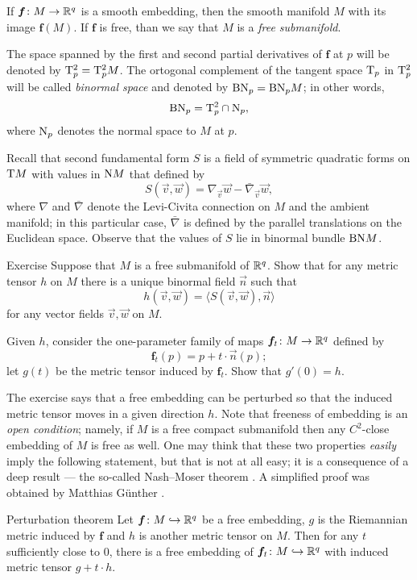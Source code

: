 If $\bm{f}\colon M\to \mathbb{R}^q$ is a smooth embedding, then the smooth manifold $M$ with its image $\bm{f}(M)$.
If $\bm{f}$ is free, than we say that $M$ is a \emph{free submanifold}.

The space spanned by the first and second partial derivatives of $\bm{f}$ at $p$ will be denoted by $\mathrm{T}^2_p=\mathrm{T}^2_pM$.
The ortogonal complement of the tangent space $\mathrm{T}_p$ in $\mathrm{T}^2_p$ will be called \emph{binormal space} and denoted by $\mathrm{BN}_p=\mathrm{BN}_pM$; in other words,
\[\mathrm{BN}_p=\mathrm{T}^2_p\cap\mathrm{N}_p,\]
where $\mathrm{N}_p$ denotes the normal space to $M$ at $p$.

Recall that second fundamental form $S$ is a field of symmetric quadratic forms on $\mathrm{T} M$  with values in $\mathrm{N} M$ that defined by 
\[S(\vec v,\vec w)=\nabla_{\vec v}\vec w-\bar\nabla_{\vec v}\vec w,\]
where $\nabla$ and $\bar \nabla$ denote the Levi-Civita connection on $M$ and the ambient manifold;
in this particular case, $\bar \nabla$ is defined by the parallel translations on the Euclidean space.
Observe that the values of $S$ lie in binormal bundle $\mathrm{BN} M$.

\begin{thm}{Exercise}\label{ex:binormal}
Suppose that $M$ is a free submanifold of $\mathbb{R}^q$.
Show that for any metric tensor $h$ on $M$ there is a unique binormal field $\vec n$ such  that 
\[h(\vec v,\vec w)=\langle S(\vec v,\vec w),\vec n\rangle\]
for any vector fields $\vec v,\vec w$ on $M$.

Given $h$, consider the one-parameter family of maps $\bm{f}_t\colon M\to \mathbb{R}^q$ defined by 
\[\bm{f}_t(p)= p+t\cdot \vec n(p);\]
let $g(t)$ be the metric tensor induced by $\bm{f}_t$.
Show that $g'(0)=h$.
\end{thm}

The exercise says that a free embedding can be perturbed so that the induced metric tensor moves in a given direction $h$.
Note that freeness of embedding is an \emph{open condition};
namely, if $M$ is a free compact submanifold then any $C^2$-close embedding of $M$ is free as well.
One may think that these two properties \emph{easily} imply the following statement,
but that is not at all easy;
it is a consequence of a deep result --- the so-called Nash--Moser theorem \cite{moser-1961}.
A simplified proof was obtained by Matthias G\"{u}nther \cite{gunter}.

\begin{thm}{Perturbation theorem}\label{thm:perturbation}
Let $\bm{f}\colon M\hookrightarrow\mathbb{R}^q$ be a free embedding, $g$ is the Riemannian metric induced by $\bm{f}$ and $h$ is another metric tensor on $M$.
Then for any $t$ sufficiently close to $0$, there is a free embedding of $\bm{f}_t\colon M\hookrightarrow\mathbb{R}^q$ with  induced metric tensor $g+t\cdot h$.  
\end{thm}

